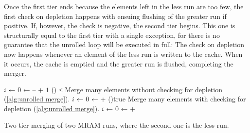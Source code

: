 Once the first tier ends because the elements left in the less run are too few, the first check on depletion happens with ensuing flushing of the greater run if positive.
If, however, the check is negative, the second tier begins.
This one is structurally equal to the first tier with a single exception, for there is no guarantee that the unrolled loop will be executed in full:
The check on depletion now happens whenever an element of the less run is written to the cache.
When it occurs, the cache is emptied and the greater run is flushed, completing the merger.

\SetArgSty{}
\SetFuncArgSty{}




\begin{algorithm*}

	\(i\) ← \(0\)  
	\Early ←  – \Factor + \(1\)\;
	\While(){ ≤ \Early}{
		Merge \Factor many elements \linebreak without checking for depletion (\cref{alg:unrolled merge}).\;
		\;
		\(i\) ← \(0\)\;
		\Out ← \Out + \Length\;
	}
	\While(){true}{
		Merge \Factor many elements \linebreak with checking for depletion (\cref{alg:unrolled merge}).\;
		\;
		\(i\) ← \(0\)\;
		\Out ← \Out + \Length\;
	}

	\caption{
		Two-tier merging of two MRAM runs, where the second one is the less run.
	}
	\label{alg:two-tier merge}
\end{algorithm*}

